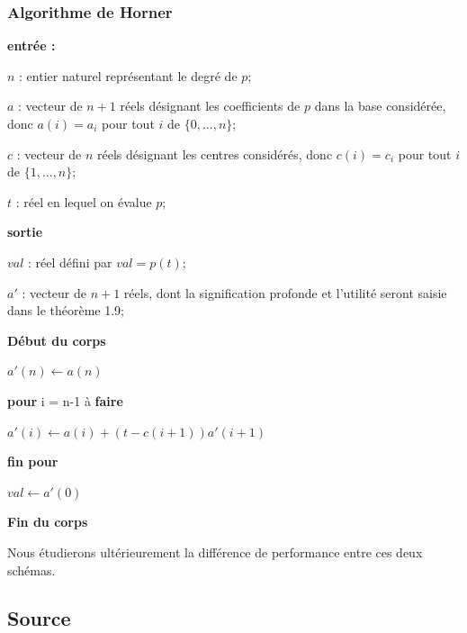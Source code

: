 \documentclass[a4paper,10pt]{report}
\begin{document}
\subsubsection*{Algorithme de Horner}

\textbf{entrée :}

\begin{list}{}{}
\item $n$ : entier naturel représentant le degré de $p$;
\item $a$ : vecteur de $n+1$ réels désignant les coefficients de $p$ dans la base considérée, donc $a(i) = a_{i}$ pour tout $i$ de $\lbrace 0, ..., n\rbrace$;
\item $c$ : vecteur de $n$ réels désignant les centres considérés, donc $c(i)=c_{i}$ pour tout $i$ de $\lbrace 1, ..., n\rbrace$;
\item $t$ : réel en lequel on évalue $p$;
\end{list}

\textbf{sortie}
\begin{list}{}{}
\item $val$ : réel défini par $val = p(t)$;
\item $a'$ : vecteur de $n+1$ réels, dont la signification profonde et l'utilité seront saisie dans le théorème 1.9;
\end{list}

\textbf{Début du corps}
\begin{list}{}{}
\item $a'(n) \longleftarrow a(n)$
\item \textbf{pour} i = n-1 à \textbf{faire}
\item \begin{list}{}{}
\item $a'(i) \longleftarrow a(i) + (t-c(i+1))a'(i+1)$
\end{list}
\item \textbf{fin pour}
\item $val \longleftarrow a'(0)$
\end{list}

\textbf{Fin du corps}

Nous étudierons ultérieurement la différence de performance entre ces deux schémas. 

\newpage
\subsection*{Source}

%
\end{document}

